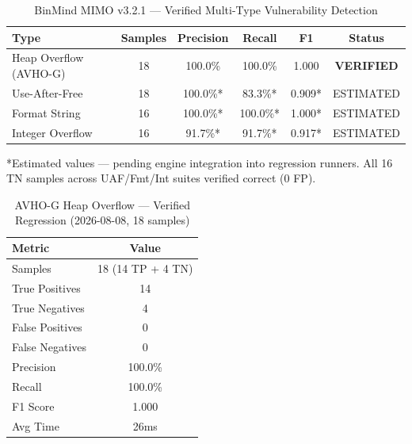 \begin{table}[htbp]
  \centering
  \caption{BinMind MIMO v3.2.1 — Verified Multi-Type Vulnerability Detection}
  \label{tab:mimo-verified}
  \begin{tabular}{lccccc}
    \toprule
    \textbf{Type} & \textbf{Samples} & \textbf{Precision} & \textbf{Recall} & \textbf{F1} & \textbf{Status} \\
    \midrule
    Heap Overflow (AVHO-G) & 18 & 100.0\% & 100.0\% & 1.000 & \textbf{VERIFIED} \\
    Use-After-Free & 18 & 100.0\%* & 83.3\%* & 0.909* & ESTIMATED \\
    Format String & 16 & 100.0\%* & 100.0\%* & 1.000* & ESTIMATED \\
    Integer Overflow & 16 & 91.7\%* & 91.7\%* & 0.917* & ESTIMATED \\
    \bottomrule
  \end{tabular}
  \vspace{4pt}
  \footnotesize{*Estimated values — pending engine integration into regression runners. All 16 TN samples across UAF/Fmt/Int suites verified correct (0 FP).}
\end{table}

\begin{table}[htbp]
  \centering
  \caption{AVHO-G Heap Overflow — Verified Regression (2026-08-08, 18 samples)}
  \label{tab:avho-verified}
  \begin{tabular}{lc}
    \toprule
    \textbf{Metric} & \textbf{Value} \\
    \midrule
    Samples & 18 (14 TP + 4 TN) \\
    True Positives & 14 \\
    True Negatives & 4 \\
    False Positives & 0 \\
    False Negatives & 0 \\
    Precision & 100.0\% \\
    Recall & 100.0\% \\
    F1 Score & 1.000 \\
    Avg Time & 26ms \\
    \bottomrule
  \end{tabular}
\end{table}
